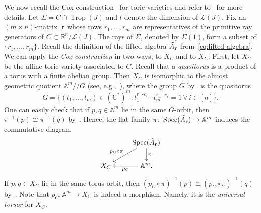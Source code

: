 \documentclass[pdftex]{sigma}%
\numberwithin{equation}{section}
\DeclareMathOperator{\trop}{Trop}
\begin{document}
We now recall the Cox construction~\cite{Cox95} for toric varieties and refer to~\cite[Section~5]{CLS} for more details.
Let $\Sigma= C\cap \trop(J)$ and
$l$ denote the dimension of $\mathcal L(J)$.
Fix an $(m\times n)$-mat\-rix~${\bf r}$ whose rows $r_1,\dots,r_{m}$ are representatives of the primitive ray generators of $\overline{C}\subset \mathbb R^n/\mathcal L(J)$.
The rays of $\Sigma$, denoted by $\Sigma(1)$, form a subset of $\{{r}_1,\dots,{r}_{m}\}$.
Recall the definition of the lifted algebra $\tilde A_{\bf r}$ from~\eqref{eq:lifted algebra}.
We can apply the {\it Cox construction} in two ways, to $X_C$ and to $X_\Sigma$:
First, let $X_{C}$ be the affine toric variety associated to $C$.
Recall that a {\it quasitorus} is a product of a torus with a finite abelian group.
Then $X_{C}$ is isomorphic to the almost geometric quotient $\mathbb A^m/\!/G$ (see, e.g.,~\cite[Theorem~5.1.11]{CLS}), where the group $G$ by~\cite[Lemma~5.1.1(b)]{CLS} is the quasitorus
\begin{equation}\label{eq:quasitorus}
G=\{(t_1,\dots,t_m)\in(\mathbb C^*)^m\colon t_1^{r_1\cdot e_i}\cdots t_m^{r_m\cdot e_i}=1\, \forall \, i\in [n]\}.
\end{equation}
One can easily check that if $p,q\in \mathbb A^m$ lie in the same $G$-orbit, then $\pi^{-1}(p)\cong \pi^{-1}(q)$ by~.
 Hence, the flat family $\pi\colon \operatorname{Spec}(\tilde A_{\bf r})\to \mathbb A^m$ induces the commutative diagram
 \begin{equation}\label{eq:Cox C}
 \begin{tikzcd}[ampersand replacement=\&,cramped]
 \& \operatorname{Spec}(\tilde A_{\bf r})\ar[d,"\pi"] \ar[dl,"p_{C}\circ \pi"'] \\
 X_{C} \& \mathbb A^m. \ar[l,"p_{C}"]
 \end{tikzcd}
 \end{equation}
 If $p,q\in X_{C}$ lie in the same torus orbit, then $(p_{C}\circ \pi)^{-1}(p)\cong (p_{C}\circ \pi)^{-1}(q)$ by~.
 Note that $p_C\colon \mathbb A^m\to X_C$ is indeed a morphism. Namely, it is the {\it universal torsor} for $X_C$.
\end{document}
